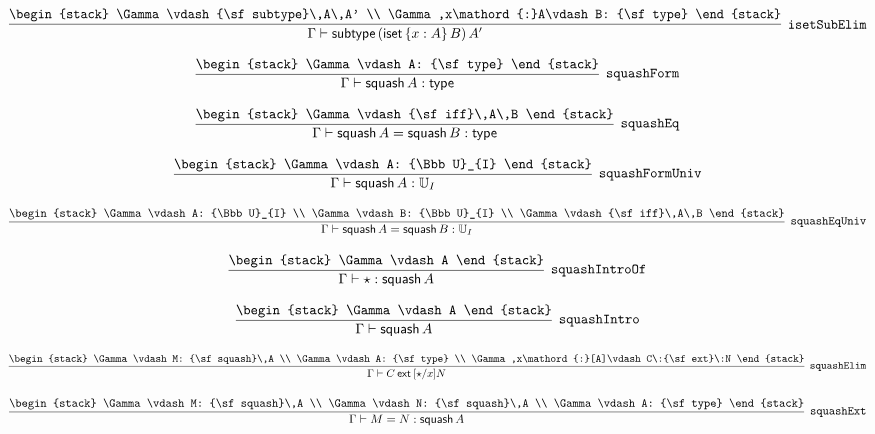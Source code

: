 \[
\infer[{\tt isetSubElim}]{\Gamma \vdash {\sf subtype}\,({\sf iset}\,\{x : A\}\,B)\,A'}{
\begin{stack}
\Gamma \vdash {\sf subtype}\,A\,A'
\\
\Gamma ,x\mathord{:}A\vdash B: {\sf type}
\end{stack}}
\]

\[
\infer[{\tt squashForm}]{\Gamma \vdash {\sf squash}\,A: {\sf type}}{
\begin{stack}
\Gamma \vdash A: {\sf type}
\end{stack}}
\]

\[
\infer[{\tt squashEq}]{\Gamma \vdash {\sf squash}\,A= {\sf squash}\,B: {\sf type}}{
\begin{stack}
\Gamma \vdash {\sf iff}\,A\,B
\end{stack}}
\]

\[
\infer[{\tt squashFormUniv}]{\Gamma \vdash {\sf squash}\,A: {\Bbb U}_{I}}{
\begin{stack}
\Gamma \vdash A: {\Bbb U}_{I}
\end{stack}}
\]

\[
\infer[{\tt squashEqUniv}]{\Gamma \vdash {\sf squash}\,A= {\sf squash}\,B: {\Bbb U}_{I}}{
\begin{stack}
\Gamma \vdash A: {\Bbb U}_{I}
\\
\Gamma \vdash B: {\Bbb U}_{I}
\\
\Gamma \vdash {\sf iff}\,A\,B
\end{stack}}
\]

\[
\infer[{\tt squashIntroOf}]{\Gamma \vdash \star : {\sf squash}\,A}{
\begin{stack}
\Gamma \vdash A
\end{stack}}
\]

\[
\infer[{\tt squashIntro}]{\Gamma \vdash {\sf squash}\,A}{
\begin{stack}
\Gamma \vdash A
\end{stack}}
\]

\[
\infer[{\tt squashElim}]{\Gamma \vdash C\:{\sf ext}\:[\star /x]N}{
\begin{stack}
\Gamma \vdash M: {\sf squash}\,A
\\
\Gamma \vdash A: {\sf type}
\\
\Gamma ,x\mathord{:}[A]\vdash C\:{\sf ext}\:N
\end{stack}}
\]

\[
\infer[{\tt squashExt}]{\Gamma \vdash M= N: {\sf squash}\,A}{
\begin{stack}
\Gamma \vdash M: {\sf squash}\,A
\\
\Gamma \vdash N: {\sf squash}\,A
\\
\Gamma \vdash A: {\sf type}
\end{stack}}
\]

